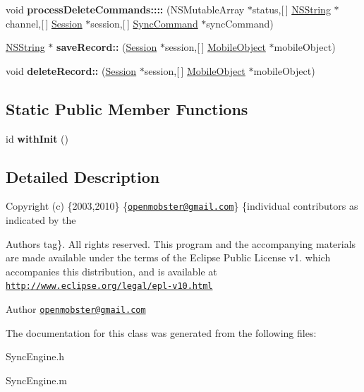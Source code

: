 \begin{DoxyCompactItemize}
\item 
\hypertarget{interface_sync_engine_a80d225eba8376088611f5503eb0c84cd}{
void {\bfseries process\-Delete\-Commands\-::::} (\-N\-S\-Mutable\-Array $\ast$status,\mbox{[}$\,$\mbox{]} \hyperlink{class_n_s_string}{\-N\-S\-String} $\ast$channel,\mbox{[}$\,$\mbox{]} \hyperlink{interface_session}{\-Session} $\ast$session,\mbox{[}$\,$\mbox{]} \hyperlink{interface_sync_command}{\-Sync\-Command} $\ast$sync\-Command)}
\label{interface_sync_engine_a80d225eba8376088611f5503eb0c84cd}

\item 
\hypertarget{interface_sync_engine_afaa7aa3a989d16724277843a60e9d54f}{
\hyperlink{class_n_s_string}{\-N\-S\-String} $\ast$ {\bfseries save\-Record\-::} (\hyperlink{interface_session}{\-Session} $\ast$session,\mbox{[}$\,$\mbox{]} \hyperlink{interface_mobile_object}{\-Mobile\-Object} $\ast$mobile\-Object)}
\label{interface_sync_engine_afaa7aa3a989d16724277843a60e9d54f}

\item 
\hypertarget{interface_sync_engine_a7d102091d243574a3b17d8492b48b9b5}{
void {\bfseries delete\-Record\-::} (\hyperlink{interface_session}{\-Session} $\ast$session,\mbox{[}$\,$\mbox{]} \hyperlink{interface_mobile_object}{\-Mobile\-Object} $\ast$mobile\-Object)}
\label{interface_sync_engine_a7d102091d243574a3b17d8492b48b9b5}

\end{DoxyCompactItemize}
\subsection*{\-Static \-Public \-Member \-Functions}
\begin{DoxyCompactItemize}
\item 
\hypertarget{interface_sync_engine_a67d7d4c91dda712944a025158f34e29b}{
id {\bfseries with\-Init} ()}
\label{interface_sync_engine_a67d7d4c91dda712944a025158f34e29b}

\end{DoxyCompactItemize}


\subsection{\-Detailed \-Description}
\-Copyright (c) \{2003,2010\} \{\href{mailto:openmobster@gmail.com}{\tt openmobster@gmail.\-com}\} \{individual contributors as indicated by the \begin{DoxyAuthor}{\-Authors}
tag\}. \-All rights reserved. \-This program and the accompanying materials are made available under the terms of the \-Eclipse \-Public \-License v1. which accompanies this distribution, and is available at \href{http://www.eclipse.org/legal/epl-v10.html}{\tt http\-://www.\-eclipse.\-org/legal/epl-\/v10.\-html}
\end{DoxyAuthor}
\begin{DoxyAuthor}{\-Author}
\href{mailto:openmobster@gmail.com}{\tt openmobster@gmail.\-com} 
\end{DoxyAuthor}


\-The documentation for this class was generated from the following files\-:\begin{DoxyCompactItemize}
\item 
\-Sync\-Engine.\-h\item 
\-Sync\-Engine.\-m\end{DoxyCompactItemize}
